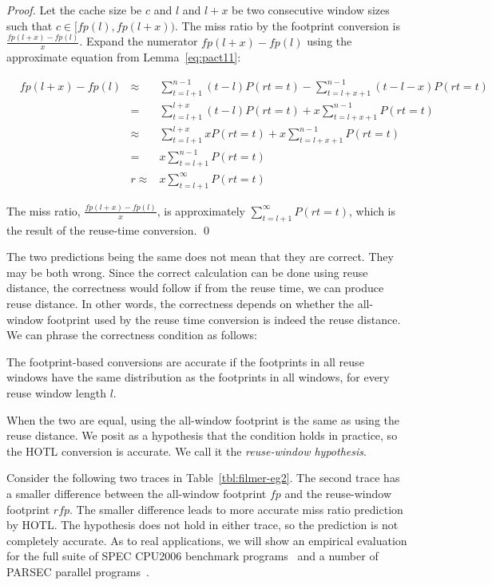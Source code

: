 \begin{proof}
  Let the cache size be $c$ and $l$ and $l+x$ be two consecutive window
  sizes such that $c \in [fp(l), fp(l+x))$. The miss ratio by the
    footprint conversion is $\frac{fp(l+x) - fp(l)}{x}$. Expand the
    numerator $fp(l+x)-fp(l)$ using the approximate equation from Lemma~\ref{eq:pact11}:
    
    \begin{align*}
      & fp(l+x) - fp(l) & 
      \approx & \sum_{t=l+1}^{n-1}(t - l) P(rt=t) - \sum_{t=l+x+1}^{n-1}(t - l -x) P(rt=t)\\
      & &= & \sum_{t=l+1}^{l+x}(t - l) P(rt=t) + x \sum_{t=l+x+1}^{n-1} P(rt=t) \\
      & &\approx & \sum_{t=l+1}^{l+x} x P(rt=t) + x \sum_{t=l+x+1}^{n-1} P(rt=t) \\
      & &= & x \sum_{t=l+1}^{n-1} P(rt=t) \\
      & &r\approx & x \sum_{t=l+1}^{\infty} P(rt=t) 
    \end{align*}

The miss ratio, $\frac{fp(l+x) - fp(l) }{x}$, is approximately
$\sum_{t=l+1}^{\infty} P(rt=t)$, which is the result of the reuse-time
conversion.  \qed 
\end{proof}

The two predictions being the same does not mean that they are
correct.  They may be both wrong.  Since the correct calculation can
be done using reuse distance, the correctness would follow if from the
reuse time, we can produce reuse distance.  In other words, the
correctness depends on whether the all-window footprint used by
the reuse time conversion is indeed the reuse distance.  We can phrase the
correctness condition as follows:

\begin{corollary}[Correctness] The footprint-based conversions are
  accurate if the footprints in all reuse windows have the same distribution
  as the footprints in all windows, for every reuse window length $l$.
\label{correctness}
\end{corollary}

\noindent When the two are equal, using the all-window footprint is
the same as using the reuse distance.  We posit as a hypothesis that
the condition holds in practice, so the HOTL conversion is accurate.
We call it the \emph{reuse-window hypothesis}.

\medskip

Consider the following two traces in Table~\ref{tbl:filmer-eg2}.  The
second trace has a smaller difference between the all-window footprint
$fp$ and the reuse-window footprint $rfp$.  The smaller difference
leads to more accurate miss ratio prediction by HOTL. The hypothesis
does not hold in either trace, so the prediction is not completely
accurate.  As to real applications, we will show an empirical
evaluation for the full suite of SPEC CPU2006 benchmark
programs~\cite{Henning:CPU2006} and a number of PARSEC parallel
programs~\cite{Bienia+:PACT08}. 

